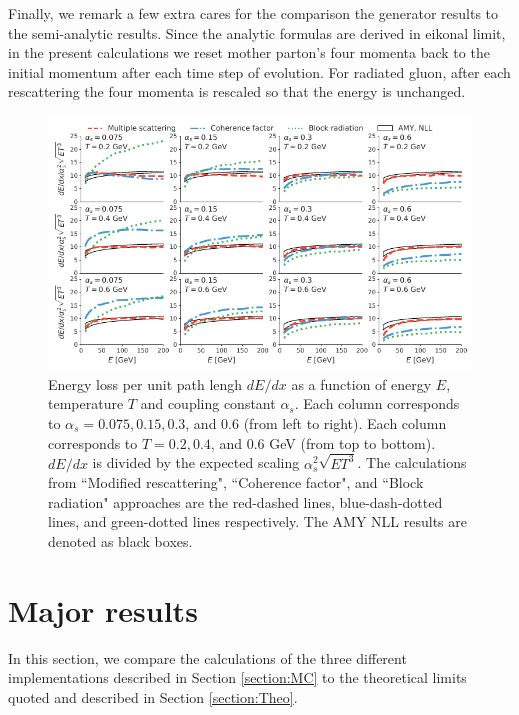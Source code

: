 \documentclass[aps, prc, reprint, amsmath, groupedaddress, nofootinbib]{revtex4-1}
\begin{document}
Finally, we remark a few extra cares for the comparison the generator results to the semi-analytic results.
Since the analytic formulas are derived in eikonal limit, in the present calculations we reset mother parton's four momenta back to the initial momentum after each time step of evolution.
For radiated gluon, after each rescattering the four momenta is rescaled so that the energy is unchanged.

\begin{figure}
\includegraphics[width=\textwidth]{Eloss_infinite.pdf}
\caption{Energy loss per unit path lengh $dE/dx$ as a function of energy $E$, temperature $T$ and coupling constant $\alpha_s$. Each column corresponds to $\alpha_s = 0.075, 0.15, 0.3$, and $0.6$ (from left to right). Each column corresponds to $T = 0.2, 0.4$, and $0.6$ GeV (from top to bottom). $dE/dx$ is divided by the expected scaling $\alpha_s^2 \sqrt{ET^3}$. The calculations from ``Modified rescattering", ``Coherence factor", and ``Block radiation" approaches are the red-dashed lines, blue-dash-dotted lines, and green-dotted lines respectively. The AMY NLL results are denoted as black boxes.}
\label{fig:eloss-inf}
\end{figure}

\section{Major results}
In this section, we compare the calculations of the three different implementations described in Section \ref{section:MC} to the theoretical limits quoted and described in Section \ref{section:Theo}. 
\end{document}
